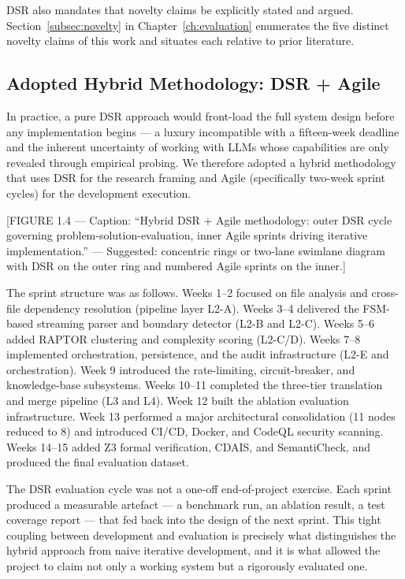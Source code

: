 \ac{DSR} also mandates that novelty claims be explicitly stated and argued.
Section~\ref{subsec:novelty} in Chapter~\ref{ch:evaluation} enumerates the
five distinct novelty claims of this work and situates each relative to prior
literature.

\subsection{Adopted Hybrid Methodology: DSR + Agile}
\label{subsec:hybrid-methodology}

In practice, a pure \ac{DSR} approach would front-load the full system design
before any implementation begins --- a luxury incompatible with a fifteen-week
deadline and the inherent uncertainty of working with \acp{LLM} whose
capabilities are only revealed through empirical probing. We therefore adopted
a hybrid methodology that uses \ac{DSR} for the research framing and Agile
(specifically two-week sprint cycles) for the development execution.

[FIGURE 1.4 --- Caption: ``Hybrid DSR + Agile methodology: outer DSR cycle
governing problem-solution-evaluation, inner Agile sprints driving
iterative implementation.'' --- Suggested: concentric rings or two-lane
swimlane diagram with DSR on the outer ring and numbered Agile sprints on
the inner.]

The sprint structure was as follows. Weeks 1--2 focused on file analysis
and cross-file dependency resolution (pipeline layer L2-A). Weeks 3--4
delivered the FSM-based streaming parser and boundary detector (L2-B and
L2-C). Weeks 5--6 added RAPTOR clustering and complexity scoring (L2-C/D).
Weeks 7--8 implemented orchestration, persistence, and the audit infrastructure
(L2-E and orchestration). Week 9 introduced the rate-limiting, circuit-breaker,
and knowledge-base subsystems. Weeks 10--11 completed the three-tier
translation and merge pipeline (L3 and L4). Week 12 built the ablation
evaluation infrastructure. Week 13 performed a major architectural consolidation
(11 nodes reduced to 8) and introduced CI/CD, Docker, and CodeQL security
scanning. Weeks 14--15 added Z3 formal verification, \ac{CDAIS}, and
SemantiCheck, and produced the final evaluation dataset.

The \ac{DSR} evaluation cycle was not a one-off end-of-project exercise. Each
sprint produced a measurable artefact --- a benchmark run, an ablation result,
a test coverage report --- that fed back into the design of the next sprint.
This tight coupling between development and evaluation is precisely what
distinguishes the hybrid approach from naive iterative development, and it is
what allowed the project to claim not only a working system but a rigorously
evaluated one.

